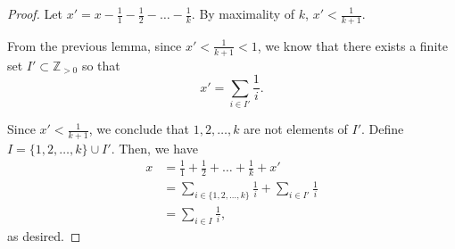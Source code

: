 \begin{sol}{}{}
\begin{proof}
		Let \(x' = x - \frac{1}{1} - \frac{1}{2} - \dots - \frac{1}{k}\). By maximality of \(k\), \(x' < \frac{1}{k+1}\). 

		From the previous lemma, since \(x' < \frac{1}{k+1} < 1\), we know that there exists a finite set \(I' \subset \mathbb{Z}_{>0}\) so that \[
			x' = \sum_{i \in I'} \frac{1}{i}.
		\]
		
		Since \(x' < \frac{1}{k+1}\), we conclude that \(1, 2, \dots, k\) are not elements of \(I'\). Define  \(I = \{1, 2, \dots, k\} \cup I'\). Then, we have
		\begin{align*}
			x &= \frac{1}{1} + \frac{1}{2} + \dots + \frac{1}{k} + x' \\
			  &= \sum_{i \in \{1, 2, \dots, k\}} \frac{1}{i} + \sum_{i \in I'} \frac{1}{i} \\
			  &= \sum_{i \in I}\frac{1}{i},
		\end{align*}
		as desired.
	\end{proof}
\end{sol}

